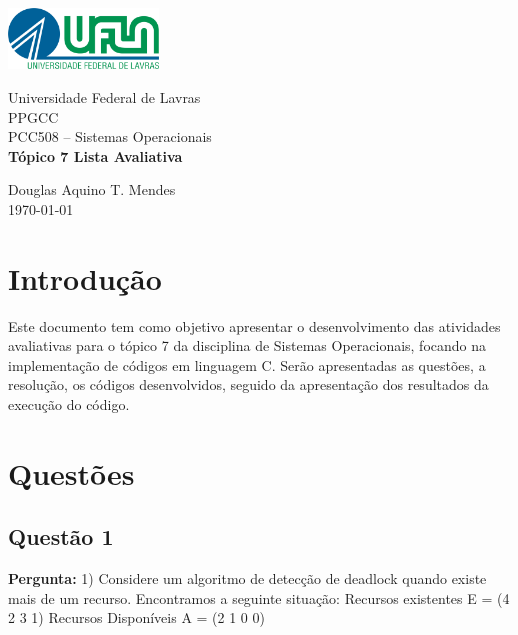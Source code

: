 \documentclass{article}
\begin{document}
\begin{titlepage}
    \centering
    \includegraphics[width=0.3\textwidth]{../../Topic1/Avaliativo/Imagens/Logo UFLA - Colorida chapada.png}

    \vspace*{2cm} %
    \Large
    Universidade Federal de Lavras\\
    PPGCC\\
    PCC508 – Sistemas Operacionais\\
    
    \vspace{2cm} %
    \huge %
    \textbf{Tópico 7 Lista Avaliativa}
    
    \vfill %
    
    \large
    Douglas Aquino T. Mendes\\
    \today %
\end{titlepage}

\tableofcontents
\newpage

\section{Introdução}
Este documento tem como objetivo apresentar o desenvolvimento das atividades avaliativas para o tópico 7 da disciplina de Sistemas Operacionais, focando na implementação de códigos em linguagem C. Serão apresentadas as questões, a resolução, os códigos desenvolvidos, seguido da apresentação dos resultados da execução do código.

\section{Questões}

\subsection{Questão 1}
\textbf{Pergunta:} 1) Considere um algoritmo de detecção de deadlock quando existe mais de um recurso. Encontramos a seguinte situação:\newline
Recursos existentes E = (4 2 3 1)\newline
Recursos Disponíveis A = (2 1 0 0)\newline
\end{document}
